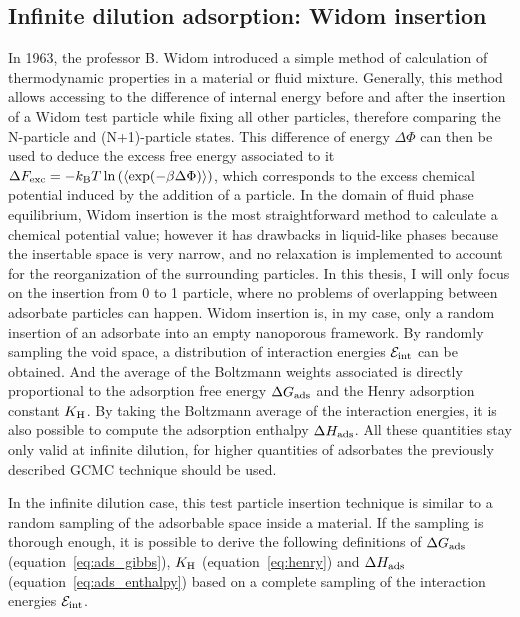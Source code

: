 \documentclass[main.tex]{subfiles}
\begin{document}
\subsection{Infinite dilution adsorption: Widom insertion}\label{sct:widom}

In 1963, the professor B. Widom introduced a simple method of calculation of thermodynamic properties in a material or fluid mixture.\autocite{Widom1963} Generally, this method allows accessing to the difference of internal energy before and after the insertion of a Widom test particle while fixing all other particles, therefore comparing the N-particle and (N+1)-particle states. This difference of energy $\Delta \Phi$ can then be used to deduce the excess free energy associated to it $\Delta F_{\text{exc}} = -k_{\text{B}} T \ln\left(\langle \exp(- \beta\Delta \Phi) \rangle\right)$, which corresponds to the excess chemical potential induced by the addition of a particle. In the domain of fluid phase equilibrium, Widom insertion is the most straightforward method to calculate a chemical potential value; however it has drawbacks in liquid-like phases because the insertable space is very narrow, and no relaxation is implemented to account for the reorganization of the surrounding particles.\autocite{Nezbeda_1991} In this thesis, I will only focus on the insertion from 0 to 1 particle, where no problems of overlapping between adsorbate particles can happen. Widom insertion is, in my case, only a random insertion of an adsorbate into an empty nanoporous framework. By randomly sampling the void space, a distribution of interaction energies $\mathcal{E}_{\text{int}}$ can be obtained. And the average of the Boltzmann weights associated is directly proportional to the adsorption free energy $\Delta G_{\text{ads}}$ and the Henry adsorption constant $K_{\text{H}}$. By taking the Boltzmann average of the interaction energies, it is also possible to compute the adsorption enthalpy $\Delta H_{\text{ads}}$. All these quantities stay only valid at infinite dilution, for higher quantities of adsorbates the previously described GCMC technique should be used.  

In the infinite dilution case, this test particle insertion technique is similar to a random sampling of the adsorbable space inside a material. If the sampling is thorough enough, it is possible to derive the following definitions of $\Delta G_{\text{ads}}$ (equation~\ref{eq:ads_gibbs}), $K_{\text{H}}$ (equation~\ref{eq:henry}) and $\Delta H_{\text{ads}}$ (equation~\ref{eq:ads_enthalpy}) based on a complete sampling of the interaction energies $\mathcal{E}_{\text{int}}$. 
\end{document}

